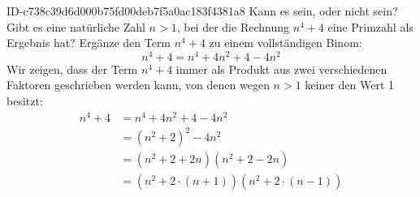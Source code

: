 \begin{exercise}
      {ID-c738c39d6d000b75fd00deb7f5a0ac183f4381a8}
      {Kann es sein, oder nicht sein?}
  \ifproblem\problem
    Gibt es eine natürliche Zahl $n>1$, bei der die Rechnung $n^{4}+4$ eine
    Primzahl als Ergebnis hat?
  \fi
  \ifoutline\outline
    Ergänze den Term $n^{4}+4$ zu einem vollständigen Binom:
    \begin{equation*}
      n^{4}+4=n^{4}+4n^{2}+4-4n^{2}
    \end{equation*}
  \fi
  \ifoutcome\outcome
    Wir zeigen, dass der Term $n^{4}+4$ immer als Produkt aus
    zwei verschiedenen Faktoren geschrieben werden kann, von denen
    wegen $n>1$ keiner den Wert 1 besitzt:
    \begin{equation*}
      \begin{split}
        n^{4}+4&=n^{4}+4n^{2}+4-4n^{2}\\
               &=\left(n^{2}+2\right)^{2}-4n^{2}\\
               &=\left(n^{2}+2+2n\right)\left(n^{2}+2-2n\right)\\
               &=\left(n^{2}+2\cdot(n+1)\right)\left(n^{2}+2\cdot(n-1)\right)
      \end{split}
    \end{equation*}
  \fi
\end{exercise}
